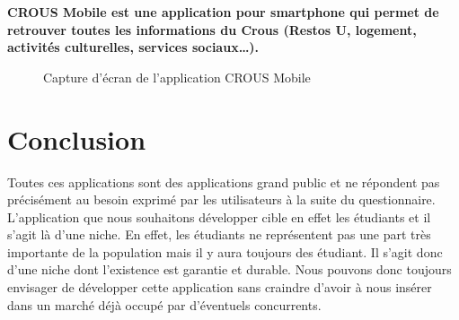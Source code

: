 \bf{CROUS Mobile} est une application pour smartphone qui permet de retrouver toutes les informations du Crous (Restos U, logement, activités culturelles, services sociaux…).

\begin{figure}[H]
    \label{fig-crous-mobile}
    \noindent{}
    \caption{Capture d'écran de l'application CROUS Mobile}
\end{figure}

\section{Conclusion}

Toutes ces applications sont des applications grand public et ne répondent pas précisément au besoin 
exprimé par les utilisateurs à la suite du questionnaire. L'application que nous souhaitons développer cible en effet les étudiants et il s'agit là d'une niche. En effet, les étudiants ne représentent pas une part très importante de la population mais il y aura toujours des étudiant. Il s'agit donc d'une niche dont l'existence est garantie et durable. Nous pouvons donc toujours envisager de développer cette application sans craindre d'avoir à nous insérer dans un marché déjà occupé par d'éventuels concurrents.
